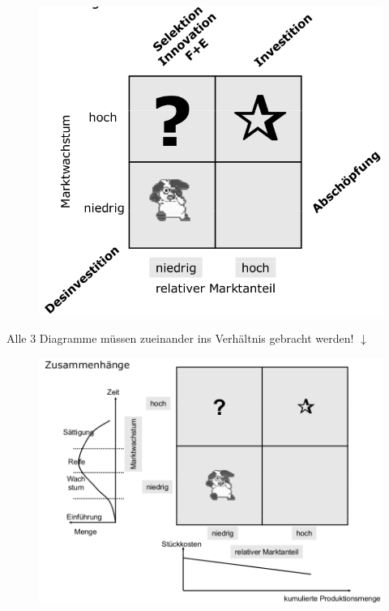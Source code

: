 \documentclass[a4paper,11pt, twoside]{article}
\begin{document}
\begin{figure}[h]
 \begin{center}
   \includegraphics[scale=0.3]{bilder/portfolio.png}
 \end{center}
\end{figure}
\begin{center}
Alle 3 Diagramme müssen zueinander ins Verhältnis gebracht werden! $\downarrow$
\end{center}
\begin{figure}[h]
 \begin{center}
   \includegraphics[scale=0.3]{bilder/portfolio_ext.png}
 \end{center}
\end{figure}
\end{document}
